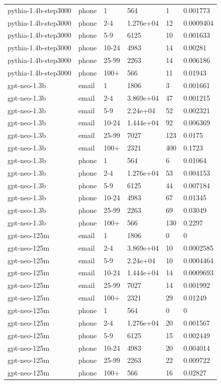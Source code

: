 \begin{tabular}{llllll}
pythia-1.4b-step3000 & phone & 1 & 564 & 1 & 0.001773 \\
pythia-1.4b-step3000 & phone & 2-4 & 1.276e+04 & 12 & 0.0009404 \\
pythia-1.4b-step3000 & phone & 5-9 & 6125 & 10 & 0.001633 \\
pythia-1.4b-step3000 & phone & 10-24 & 4983 & 14 & 0.00281 \\
pythia-1.4b-step3000 & phone & 25-99 & 2263 & 14 & 0.006186 \\
pythia-1.4b-step3000 & phone & 100+ & 566 & 11 & 0.01943 \\
gpt-neo-1.3b & email & 1 & 1806 & 3 & 0.001661 \\
gpt-neo-1.3b & email & 2-4 & 3.869e+04 & 47 & 0.001215 \\
gpt-neo-1.3b & email & 5-9 & 2.24e+04 & 52 & 0.002321 \\
gpt-neo-1.3b & email & 10-24 & 1.444e+04 & 92 & 0.006369 \\
gpt-neo-1.3b & email & 25-99 & 7027 & 123 & 0.0175 \\
gpt-neo-1.3b & email & 100+ & 2321 & 400 & 0.1723 \\
gpt-neo-1.3b & phone & 1 & 564 & 6 & 0.01064 \\
gpt-neo-1.3b & phone & 2-4 & 1.276e+04 & 53 & 0.004153 \\
gpt-neo-1.3b & phone & 5-9 & 6125 & 44 & 0.007184 \\
gpt-neo-1.3b & phone & 10-24 & 4983 & 67 & 0.01345 \\
gpt-neo-1.3b & phone & 25-99 & 2263 & 69 & 0.03049 \\
gpt-neo-1.3b & phone & 100+ & 566 & 130 & 0.2297 \\
gpt-neo-125m & email & 1 & 1806 & 0 & 0 \\
gpt-neo-125m & email & 2-4 & 3.869e+04 & 10 & 0.0002585 \\
gpt-neo-125m & email & 5-9 & 2.24e+04 & 10 & 0.0004464 \\
gpt-neo-125m & email & 10-24 & 1.444e+04 & 14 & 0.0009693 \\
gpt-neo-125m & email & 25-99 & 7027 & 14 & 0.001992 \\
gpt-neo-125m & email & 100+ & 2321 & 29 & 0.01249 \\
gpt-neo-125m & phone & 1 & 564 & 0 & 0 \\
gpt-neo-125m & phone & 2-4 & 1.276e+04 & 20 & 0.001567 \\
gpt-neo-125m & phone & 5-9 & 6125 & 15 & 0.002449 \\
gpt-neo-125m & phone & 10-24 & 4983 & 20 & 0.004014 \\
gpt-neo-125m & phone & 25-99 & 2263 & 22 & 0.009722 \\
gpt-neo-125m & phone & 100+ & 566 & 16 & 0.02827 \\
\bottomrule
\end{tabular}
